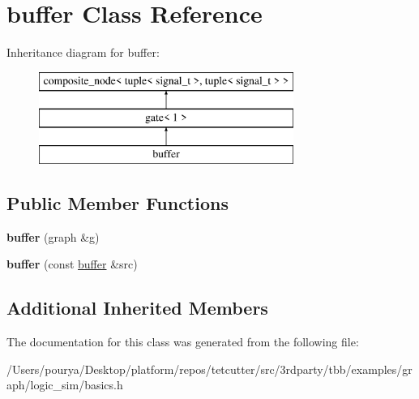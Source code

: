 \hypertarget{classbuffer}{}\section{buffer Class Reference}
\label{classbuffer}
Inheritance diagram for buffer\+:\begin{figure}[H]
\begin{center}
\leavevmode
\includegraphics[height=3.000000cm]{classbuffer}
\end{center}
\end{figure}
\subsection*{Public Member Functions}
\begin{DoxyCompactItemize}
\item 
\hypertarget{classbuffer_a7b3612ac8bf8cf51e8c341591e0c82b2}{}{\bfseries buffer} (graph \&g)\label{classbuffer_a7b3612ac8bf8cf51e8c341591e0c82b2}

\item 
\hypertarget{classbuffer_aed16a49042088c22d526cb625c2c79e6}{}{\bfseries buffer} (const \hyperlink{classbuffer}{buffer} \&src)\label{classbuffer_aed16a49042088c22d526cb625c2c79e6}

\end{DoxyCompactItemize}
\subsection*{Additional Inherited Members}


The documentation for this class was generated from the following file\+:\begin{DoxyCompactItemize}
\item 
/\+Users/pourya/\+Desktop/platform/repos/tetcutter/src/3rdparty/tbb/examples/graph/logic\+\_\+sim/basics.\+h\end{DoxyCompactItemize}
